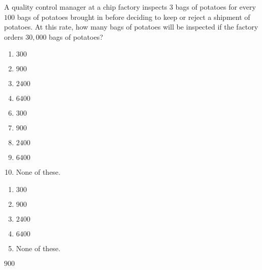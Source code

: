  
A quality control manager at a chip factory inspects $3$ bags of potatoes for every $100$ bags of potatoes brought in before deciding to keep or reject a shipment of potatoes.  At this rate, how many bags of potatoes will be inspected if the factory orders $30,000$ bags of potatoes?


\ifsat
	\begin{enumerate}[label=\Alph*)]
		\item $300 $ 
		\item $900 $ %
		\item $2400 $ 
		\item $6400 $
	\end{enumerate}
\else
\fi

\ifacteven
	\begin{enumerate}[label=\textbf{\Alph*.},itemsep=\fill,align=left]
		\setcounter{enumii}{5}
		\item $300 $ 
		\item $900 $ %
		\item $2400 $ 
		\addtocounter{enumii}{1}
		\item $6400 $
		\item None of these. 
	\end{enumerate}
\else
\fi

\ifactodd
	\begin{enumerate}[label=\textbf{\Alph*.},itemsep=\fill,align=left]
		\item $300 $ 
		\item $900 $ %
		\item $2400 $ 
		\item $6400 $
		\item None of these. 
	\end{enumerate}
\else
\fi

\ifgridin
 $900 $ %
		
\else
\fi

